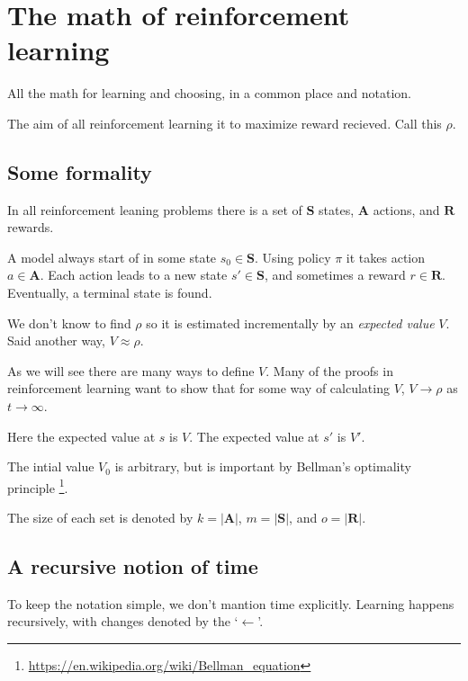 \documentclass[8pt]{article}
\begin{document}
\section*{The math of reinforcement learning}
All the math for learning and choosing, in a common place and notation.

\begin{multicols}{4}

The aim of all reinforcement learning it to maximize reward recieved. Call this $\rho$.

\subsection*{Some formality} 
In all reinforcement leaning problems there is a set of $\textbf{S}$ states, $\textbf{A}$ actions, and $\textbf{R}$ rewards. 

A model always start of in some state $s_0 \in \textbf{S}$. Using policy $\pi$ it takes action $a \in \textbf{A}$. Each action leads to a new state $s' \in \textbf{S}$, and sometimes a reward $r \in \textbf{R}$. Eventually, a terminal state is found. 

We don't know to find $\rho$ so it is estimated incrementally by an \emph{expected value} $V$. Said another way, $V \approx \rho$. 

As we will see there are many ways to define $V$. Many of the proofs in reinforcement learning want to show that for some way of calculating $V$, $V \rightarrow \rho$ as $t \rightarrow \infty$.

Here the expected value at $s$ is $V$. The expected value at $s'$ is $V'$. 

The intial value $V_0$ is arbitrary, but is important by Bellman's optimality principle \footnote{\url{https://en.wikipedia.org/wiki/Bellman_equation}}.

The size of each set is denoted by $k = |\textbf{A}|$, $m = |\textbf{S}|$, and $o = |\textbf{R}|$.

\subsection*{A recursive notion of time}
To keep the notation simple, we don't mantion time explicitly. Learning happens recursively, with changes denoted by the `$\leftarrow$'.  


\end{multicols}
\end{document}
